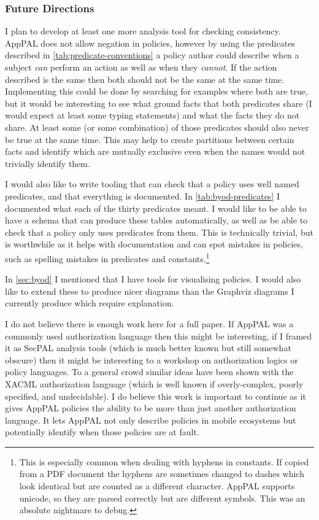 \documentclass[a4paper]{scrartcl}
\begin{document}
\subsubsection*{Future Directions}

I plan to develop at least one more analysis tool for checking consistency.
AppPAL does not allow negation in policies, however by using the predicates
described in \autoref{tab:predicate-conventions} a policy author could describe
when a subject \emph{can} perform an action as well as when they \emph{cannot}.
If the action described is the same then both should not be the same at the same
time.  Implementing this could be done by searching for examples where both are
true, but it would be interesting to see what ground facts that both
predicates share (I would expect at least some typing statements) and
what the facts they do not share.  At least some (or some combination) of those
predicates should also never be true at the same time.  This may help to create
partitions between certain facts and identify which are mutually exclusive even
when the names would not trivially identify them.

I would also like to write tooling that can check that a policy uses well named
predicates, and that everything is documented.  In \autoref{tab:byod-predicates}
I documented what each of the thirty predicates meant.  I would like to be able
to have a schema that can produce these tables automatically, as well as be able to
check that a policy only uses predicates from them.  This is technically
trivial, but is worthwhile as it helps with documentation and can spot mistakes
in policies, such as spelling mistakes in predicates and constants.\footnote{This is
  especially common when dealing with hyphens in constants.  If copied from a
  PDF document the hyphens are sometimes changed to dashes which look identical
  but are counted as a different character.  AppPAL supports unicode, so they
  are parsed correctly but are different symbols.  This was an absolute
  nightmare to debug.}

In \autoref{sec:byod} I mentioned that I have tools for visualising policies.  I
would also like to extend these to produce nicer diagrams than the Graphviz
diagrams I currently produce which require explanation.

I do not believe there is enough work here for a full paper.  If AppPAL was a
commonly used authorization language then this might be interesting, if I framed
it as SecPAL analysis tools (which is much better known but still somewhat
obscure) then it might be interesting to a workshop on authorization logics or
policy languages.   To a general crowd similar ideas have been shown with the
XACML authorization language (which is well known if overly-complex, poorly
specified, and undecidable).  I do believe this work is important to continue as
it gives AppPAL policies the ability to be more than just another authorization
language. It lets AppPAL not only describe policies in mobile ecosystems but
potentially identify when those policies are at fault.
\end{document}
